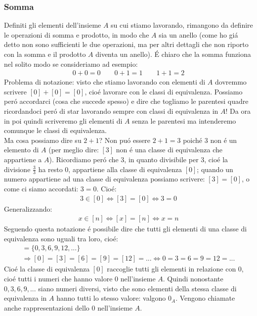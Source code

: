 \documentclass[twoside]{article} %
\begin{document}
	\subsubsection{Somma} 
	Definiti gli elementi dell'insieme $A$ su cui stiamo lavorando, rimangono da definire le operazioni di somma e prodotto, in modo che $A$ sia un anello (come ho gi\'a detto non sono sufficienti le due operazioni, ma per altri dettagli che non riporto con la somma e il prodotto $A$ diventa un anello). \'E chiaro che la somma funziona nel solito modo se consideriamo ad esempio:
	 \begin{gather*}
	 	0+0=0\qquad 0+1=1 \qquad 1+1=2
	 \end{gather*}
	 Problema di notazione: visto che stiamo lavorando con elementi di $A$ dovremmo scrivere $[0]+[0]=[0]$, cio\'e lavorare con le classi di equivalenza. Possiamo per\'o accordarci (cosa che succede spesso) e dire che togliamo le parentesi quadre ricordandoci per\'o di star lavorando sempre con classi di equivalenza in $A$! Da ora in poi quindi scriveremo gli elementi di $A$ senza le parentesi ma intenderemo comunque le classi di equivalenza.\\
	 Ma cosa possiamo dire su $2+1$? Non pu\'o essere $2+1=3$ poich\'e $3$ non \'e un elemento di $A$ (per meglio dire: $[3]$ non \'e una classe di equivalenza che appartiene a $A$). Ricordiamo per\'o che 3, in quanto divisibile per 3, cio\'e la divisione $\frac{3}{3}$ ha resto 0, appartiene alla classe di equivalenza $[0]$; quando un numero appartiene ad una classe di equivalenza possiamo scrivere: $[3]=[0]$, o come ci siamo accordati: $3=0$. Cio\'e:
	\begin{gather*}
		3\in [0]\Leftrightarrow [3]=[0]\Leftrightarrow 3=0
	\end{gather*}	 
	Generalizzando:
	\begin{gather*}
		x\in [n]\Leftrightarrow [x]=[n]\Leftrightarrow x=n
	\end{gather*}
	Seguendo questa notazione \'e possibile dire che tutti gli elementi di una classe di equivalenza sono uguali tra loro, cio\'e:
	\begin{gather*}
		[0]=\{0,3,6,9,12,...\}\\
		\Rightarrow [0]=[3]=[6]=[9]=[12]=...\Leftrightarrow 0=3=6=9=12=...
	\end{gather*}
	Cio\'e la classe di equivalenza $[0]$ raccoglie tutti gli elementi in relazione con $0$, cio\'e tutti i numeri che hanno valore $0$ nell'insieme $A$. Quindi nonostante $0,3,6,9,...$ siano numeri diversi, visto che sono elementi della stessa classe di equivalenza in $A$ hanno tutti lo stesso valore: valgono $0_A$. Vengono chiamate anche rappresentazioni dello $0$ nell'insieme $A$.\\
\end{document}
